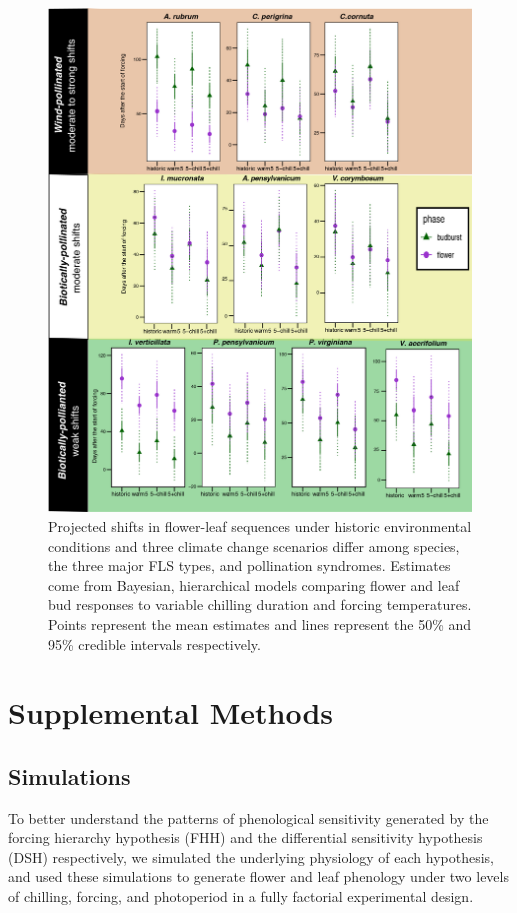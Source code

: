 \documentclass{article}\usepackage[]{graphicx}\usepackage[]{color}
\begin{document}
 \begin{figure}[!ht]
    \centering
 \includegraphics[width=\textwidth]{..//Plots/Flobuds_manuscript_figs/climpredictions.jpg}
    \caption{Projected shifts in flower-leaf sequences under historic environmental conditions and three climate change scenarios differ among species, the three major FLS types, and pollination syndromes. Estimates come from Bayesian, hierarchical models comparing flower and leaf bud responses to variable chilling duration and forcing temperatures. Points represent the mean estimates and lines represent the 50\% and 95\% credible intervals respectively.}
    \label{fig:preddy_sp}
\end{figure}


\section*{Supplemental Methods}
\subsection*{Simulations}
\noident To better understand the patterns of phenological sensitivity generated by the forcing hierarchy hypothesis (FHH) and the differential sensitivity hypothesis (DSH) respectively, we simulated the underlying physiology of each hypothesis, and used these simulations to generate flower and leaf phenology under two levels of chilling, forcing, and photoperiod in a fully factorial experimental design.\\
\end{document}
